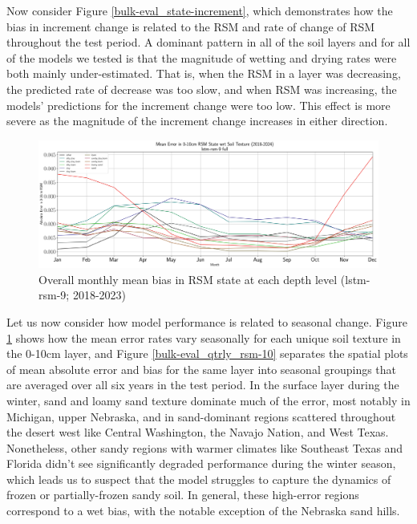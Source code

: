 Now consider Figure \ref{bulk-eval_state-increment}, which demonstrates how the bias in increment change is related to the RSM and rate of change of RSM throughout the test period. A dominant pattern in all of the soil layers and for all of the models we tested is that the magnitude of wetting and drying rates were both mainly under-estimated. That is, when the RSM in a layer was decreasing, the predicted rate of decrease was too slow, and when RSM was increasing, the models' predictions for the increment change were too low. This effect is more severe as the magnitude of the increment change increases in either direction.

\begin{figure}[h!]
    \centering
    \includegraphics[width=.99\linewidth,draft=false]{figures/grid-eval_qtrly/eval-grid_full_lstm-rsm-9_pixelwise-time-stats_monthly-txtr-abs-err-state-rsm-10.png}

    \caption{Overall monthly mean bias in RSM state at each depth level (lstm-rsm-9; 2018-2023)}
    \label{bulk-eval_monthly-txtr-error}
\end{figure}

Let us now consider how model performance is related to seasonal change. Figure \ref{bulk-eval_monthly-txtr-error} shows how the mean error rates vary seasonally for each unique soil texture in the 0-10cm layer, and Figure \ref{bulk-eval_qtrly_rsm-10} separates the spatial plots of mean absolute error and bias for the same layer into seasonal groupings that are averaged over all six years in the test period. In the surface layer during the winter, sand and loamy sand texture dominate much of the error, most notably in Michigan, upper Nebraska, and in sand-dominant regions scattered throughout the desert west like Central Washington, the Navajo Nation, and West Texas. Nonetheless, other sandy regions with warmer climates like Southeast Texas and Florida didn't see significantly degraded performance during the winter season, which leads us to suspect that the model struggles to capture the dynamics of frozen or partially-frozen sandy soil. In general, these high-error regions correspond to a wet bias, with the notable exception of the Nebraska sand hills.

